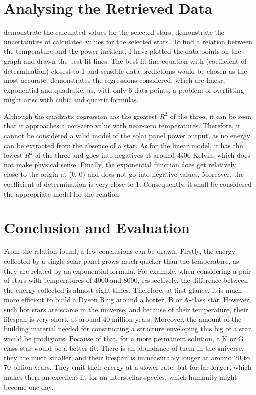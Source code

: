 \documentclass[stu, 11pt, a4paper, floatsintext, noextraspace]{apa7}
\begin{document}
	\section{Analysing the Retrieved Data}
	 demonstrate the calculated values for the selected stars.  demonstrate the uncertainties of calculated values for the selected stars. To find a relation between the temperature and the power incident, I have plotted the data points on the graph and drawn the best-fit lines. The best-fit line equation with  (coefficient of determination) closest to 1 and sensible data predictions would be chosen as the most accurate.  demonstrates the regressions considered, which are linear, exponential and quadratic, as, with only 6 data points, a problem of overfitting might arise with cubic and quartic formulas.
	
	Although the quadratic regression has the greatest $R^2$ of the three, it can be seen that it approaches a non-zero value with near-zero temperatures. Therefore, it cannot be considered a valid model of the solar panel power output, as no energy can be extracted from the absence of a star. As for the linear model, it has the lowest $R^2$ of the three and goes into negatives at around 4400 Kelvin, which does not make physical sense. Finally, the exponential function does get relatively close to the origin at (0, 0) and does not go into negative values. Moreover, the coefficient of determination is very close to 1. Consequently, it shall be considered the appropriate model for the relation.
	\section{Conclusion and Evaluation}
	From the relation found, a few conclusions can be drawn. Firstly, the energy collected by a single solar panel grows much quicker than the temperature, as they are related by an exponential formula. For example, when considering a pair of stars with temperatures of 4000 and 8000, respectively, the difference between the energy collected is almost eight times. Therefore, at first glance, it is much more efficient to build a Dyson Ring around a hotter, B or A-class star. However, such hot stars are scarce in the universe, and because of their temperature, their lifespan is very short, at around 40 million years. Moreover, the amount of the building material needed for constructing a structure enveloping this big of a star would be prodigious. Because of that, for a more permanent solution, a K or G class star would be a better fit. There is an abundance of them in the universe, they are much smaller, and their lifespan is immeasurably longer at around 20 to 70 billion years. They emit their energy at a slower rate, but for far longer, which makes them an excellent fit for an interstellar species, which humanity might become one day.
	
\end{document}
